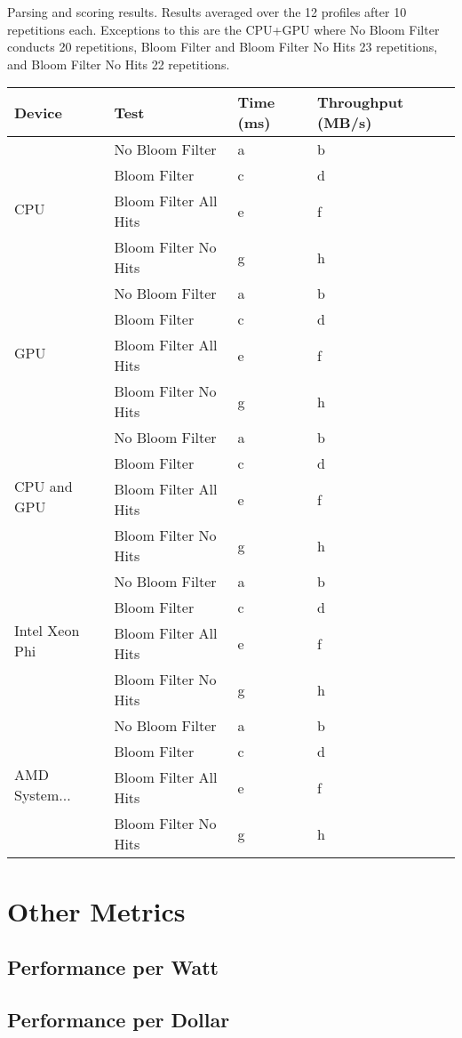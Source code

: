 Parsing and scoring results. Results averaged over the 12 profiles after 10
repetitions each. Exceptions to this are the CPU+GPU where No Bloom Filter
conducts 20 repetitions, Bloom Filter and Bloom Filter No Hits 23 repetitions,
and Bloom Filter No Hits 22 repetitions.

\begin{tabular}{|l|l|l|l|}
\hline
Device & Test & Time (ms) & Throughput (MB/s)\\
\hline
\multirow{4}{*}{CPU}
& No Bloom Filter & a & b \\
& Bloom Filter & c & d \\
& Bloom Filter All Hits & e & f \\
& Bloom Filter No Hits & g & h \\
\hline
\multirow{4}{*}{GPU}
& No Bloom Filter & a & b \\
& Bloom Filter & c & d \\
& Bloom Filter All Hits & e & f \\
& Bloom Filter No Hits & g & h \\
\hline
\multirow{4}{*}{CPU and GPU}
& No Bloom Filter & a & b \\
& Bloom Filter & c & d \\
& Bloom Filter All Hits & e & f \\
& Bloom Filter No Hits & g & h \\
\hline
\multirow{4}{*}{Intel Xeon Phi}
& No Bloom Filter & a & b \\
& Bloom Filter & c & d \\
& Bloom Filter All Hits & e & f \\
& Bloom Filter No Hits & g & h \\
\hline
\multirow{4}{*}{AMD System...}
& No Bloom Filter & a & b \\
& Bloom Filter & c & d \\
& Bloom Filter All Hits & e & f \\
& Bloom Filter No Hits & g & h \\
\hline
\end{tabular}

\section{Other Metrics}

\subsection{Performance per Watt}

\subsection{Performance per Dollar}
